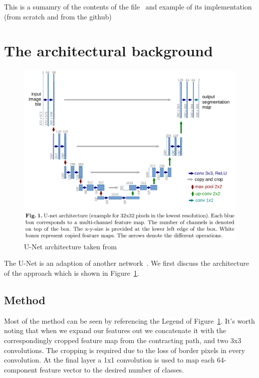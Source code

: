 \documentclass[11pt]{article}
\begin{document}


\tableofcontents

\clearpage

This is a sumamry of the contents of the file~\cite{U-Net} and example of its implementation (from scratch and from the github)

\section{The architectural background} 

\begin{figure}[H]
    \centering
    \includegraphics[width=\linewidth]{images/u-net.png}
    \caption{U-Net architecture taken from~\cite{U-Net}}
    \label{fig:u-net-architecture}
\end{figure}

The U-Net is an adaption of another network~\cite{fully-CNNs-for-semantic-segmentation}. We first discuss the architecture of the approach which is shown in Figure~\ref{fig:u-net-architecture}.

\subsection{Method}

Most of the method can be seen by referencing the Legend of Figure~\ref{fig:u-net-architecture}. It's worth noting that when we expand our features out we concatenate it with the correspondingly cropped feature map from the contracting path, and two 3x3 convolutions. The cropping is required due to the loss of border pixels in every convolution. At the final layer a 1x1 convolution is used to map each 64-component feature vector to the desired number of classes.
\end{document}
